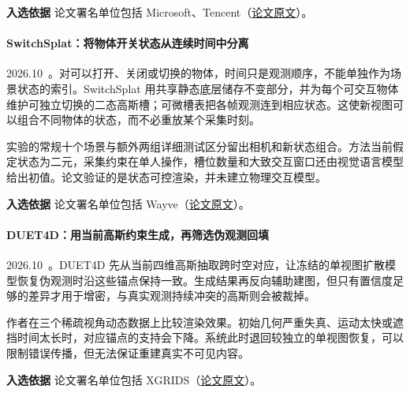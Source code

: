 \textbf{入选依据} 论文署名单位包括 Microsoft、Tencent（\href{https://arxiv.org/abs/2610.14685}{论文原文}）。

\paragraph{SwitchSplat：将物体开关状态从连续时间中分离}
2026.10~\cite{2610_24812}。对可以打开、关闭或切换的物体，时间只是观测顺序，不能单独作为场景状态的索引。SwitchSplat 用共享静态底层储存不变部分，并为每个可交互物体维护可独立切换的二态高斯槽；可微槽表把各帧观测连到相应状态。这使新视图可以组合不同物体的状态，而不必重放某个采集时刻。

实验的常规十个场景与额外两组详细测试区分留出相机和新状态组合。方法当前假定状态为二元，采集约束在单人操作，槽位数量和大致交互窗口还由视觉语言模型给出初值。论文验证的是状态可控渲染，并未建立物理交互模型。

\textbf{入选依据} 论文署名单位包括 Wayve（\href{https://arxiv.org/abs/2610.24812}{论文原文}）。

\paragraph{DUET4D：用当前高斯约束生成，再筛选伪观测回填}
2026.10~\cite{2610_35002}。DUET4D 先从当前四维高斯抽取跨时空对应，让冻结的单视图扩散模型恢复伪观测时沿这些锚点保持一致。生成结果再反向辅助建图，但只有置信度足够的差异才用于增密，与真实观测持续冲突的高斯则会被裁掉。

作者在三个稀疏视角动态数据上比较渲染效果。初始几何严重失真、运动太快或遮挡时间太长时，对应锚点的支持会下降。系统此时退回较独立的单视图恢复，可以限制错误传播，但无法保证重建真实不可见内容。

\textbf{入选依据} 论文署名单位包括 XGRIDS（\href{https://arxiv.org/abs/2610.35002}{论文原文}）。
